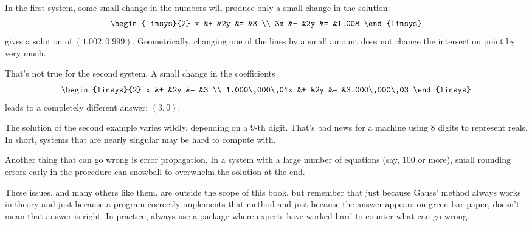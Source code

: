 In the first system, some small change in the numbers will produce only a
small change in the solution:
\begin{equation*}
 \begin{linsys}{2}
  x  &+  &2y &= &3                  \\
  3x &-  &2y &= &1.008
 \end{linsys}
\end{equation*}
gives a solution of \( (1.002,0.999) \).
Geometrically, changing one of the lines by a small amount does not change
the intersection point by very much.

That's not true for the second system.
A small change in the coefficients
\begin{equation*}
 \begin{linsys}{2}
   x              &+ &2y  &=  &3                  \\
  1.000\,000\,01x &+ &2y  &=  &3.000\,000\,03
 \end{linsys}
\end{equation*}
leads to a completely different answer: \( (3,0) \).

The solution of the second example
varies wildly, depending on a \( 9 \)-th digit.
That's bad news for a machine using \( 8 \) digits to represent reals.
In short, systems that are nearly singular may be hard
to compute with.

Another thing that can go wrong is error propagation.
In a system with a large number of equations (say, 100 or more), small
rounding errors early in the procedure can snowball to overwhelm the
solution at the end.

These issues, and many others like them,
are outside the scope of this book, but remember that
just because Gauss' method always works in theory and just
because a program correctly implements that method
and just because the answer appears on green-bar paper, doesn't
mean that answer is right.
In practice, always use a package
where experts have worked hard to counter what can go wrong.
%
